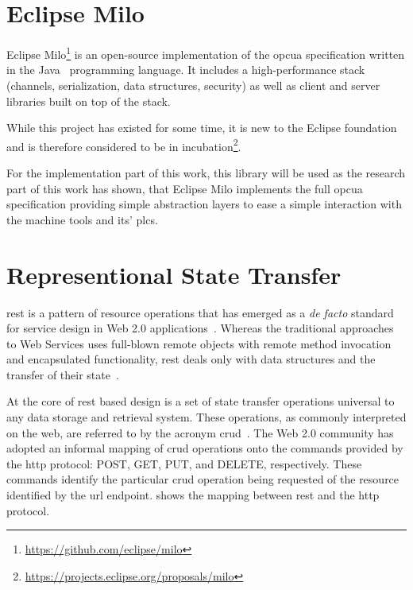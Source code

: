 \documentclass[
a4paper,
twoside,
headsepline,
cleardoublepage=empty,
parskip=half,
draft=false
]{scrbook}
\begin{document}
		\section{Eclipse Milo}\label{sec:eclipse_milo}

			Eclipse Milo\footnote{\url{https://github.com/eclipse/milo}} is an open-source implementation of the \gls{opcua} specification written in the Java~\cite{java2015} programming language. 
			It includes a high-performance stack (channels, serialization, data structures, security) as well as client and server libraries built on top of the stack.
			
			While this project has existed for some time, it is new to the Eclipse foundation and is therefore considered to be in incubation\footnote{\url{https://projects.eclipse.org/proposals/milo}}.
			
			For the implementation part of this work, this library will be used as the research part of this work has shown, that Eclipse Milo implements the full \gls{opcua} specification providing simple abstraction layers to ease a simple interaction with the machine tools and its' \gls{plc}s.

		\section{Representional State Transfer}\label{sec:rest}

			\gls{rest} is a pattern of resource operations that has emerged as a \textit{de facto} standard for service design in Web 2.0 applications~\cite{battle2008bridging}. Whereas the traditional approaches to Web Services uses full-blown remote objects with remote method invocation and encapsulated functionality, \gls{rest} deals only with data structures and the transfer of their state~\cite{fielding2000architectural}.
			
			At the core of \gls{rest} based design is a set of state transfer operations universal to any data storage and retrieval system.
			These operations, as commonly interpreted on the web, are referred to by the acronym \gls{crud}~\cite{battle2008bridging}.
			The Web 2.0 community has adopted an informal mapping of \gls{crud} operations onto the commands provided by the \gls{http} protocol: POST, GET, PUT, and DELETE, respectively. 
			These commands identify the particular \gls{crud} operation being requested of the resource identified by the \gls{url} endpoint.
			 shows the mapping between \gls{rest} and the \gls{http} protocol.
			
\end{document}
